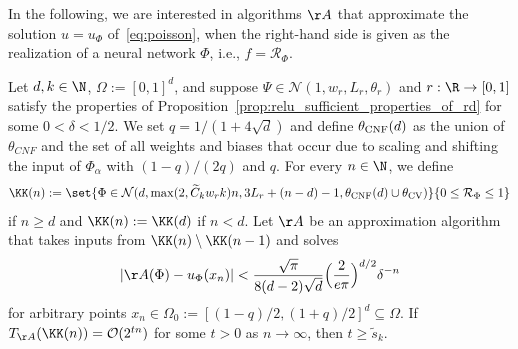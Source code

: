 \documentclass{amsart}[11pt]
\numberwithin{equation}{section}
\newcommand{\nn}{\mathcal{N}}
\newcommand{\realization}{\mathcal{R}}
\newcommand{\order}{\mathcal{O}}
\newcommand{\worstTime}{T}
\numberwithin{theorem}{section}
\begin{document}
    In the following, we are interested in algorithms $\AA$ that approximate the solution $u=u_\Phi$ of~\eqref{eq:poisson}, when the right-hand side is given as the realization of a neural network $\Phi$, i.e., $f=\realization_\Phi$.
    \begin{theorem}\label{thm:hardness_pde} 
        Let $d, k\in \N$, $\Omega:=[0,1]^d$, and suppose $\Psi \in \nn(1, w_r, L_r, \theta_r)$ and $r: \R \to [0, 1]$ satisfy the properties of Proposition~\ref{prop:relu_sufficient_properties_of_rd} for some $0 < \delta < 1/2$. We set $q = 1/(1+4\sqrt{d})$ and define $\theta_{\rm CNF}(d)$ as the union of $\theta_{CNF}$ and the set of all weights and biases that occur due to scaling and shifting the input of $\Phi_\alpha$ with $(1- q)/(2q)$ and $q$. For every $n \in \N$, we define
        \begin{align*}
            \KK(n) := \set{ \Phi \in \nn(d, \max(2, \widetilde C_k w_r k)n, 3L_r + (n - d) - 1, \theta_{\rm{CNF}} (d)\cup \theta_{\rm CV})}{0 \leq \realization_\Phi \leq 1}
        \end{align*}
        if $n \geq d$ and $\KK(n) := \KK(d)$ if $n < d$. Let $\AA$ be an approximation algorithm that takes inputs from $\KK(n)\setminus\KK(n-1)$ and solves
        \begin{align*}
            \left|\AA(\Phi) -u_\Phi(x_n)\right| < \frac{\sqrt{\pi}}{8(d-2)\sqrt{d}}\Big(\frac{2}{e\pi}\Big)^{d/2}\delta^{-n}
        \end{align*}
        for arbitrary points $x_n\in \Omega_0:=[(1-q)/2, (1+q)/2]^d\subseteq \Omega$. If $\worstTime_{\AA}(\KK(n)) = \order(2^{tn})$ for some $t>0$ as $n \to \infty$, then $t \geq \widetilde s_k$.
    \end{theorem}
\end{document}
